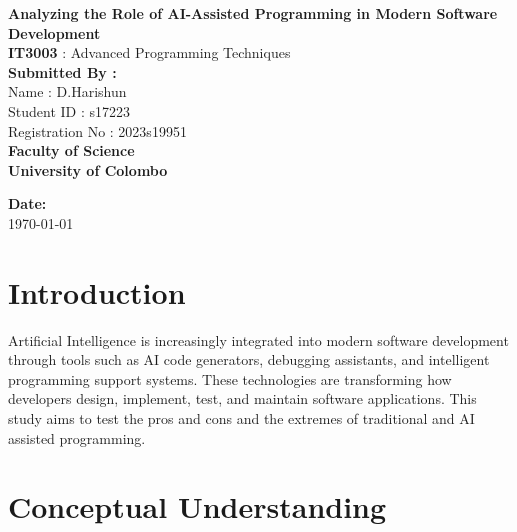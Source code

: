 \documentclass[12pt, a4paper]{article}
\begin{document}
\begin{titlepage}
    \begin{center}
        \vspace*{2cm}
        
        {\fontsize{24}{28}\bfseries Analyzing the Role of AI-Assisted Programming in Modern Software Development}\\[0.8cm]
        
        {\fontsize{14}{16} \textbf{IT3003} : Advanced Programming Techniques}\\[2cm]
        
        \textbf{Submitted By :}\\[0.2cm]
        {\fontsize{14}{16} Name : D.Harishun}\\
        {\fontsize{14}{16} Student ID : s17223}\\
        {\fontsize{14}{16} Registration No : 2023s19951}\\[3cm]

        \textbf{Faculty of Science}\\
        \textbf{University of Colombo}\\[0.2cm]
        
        \vfill
        
        \textbf{Date:}\\[0.2cm]
        {\fontsize{14}{16} \today}\\[1cm]
    \end{center}
\end{titlepage}
\newpage

\section{Introduction}
Artificial Intelligence is increasingly integrated into modern software development through tools
such as AI code generators, debugging assistants, and intelligent programming support systems.
These technologies are transforming how developers design, implement, test, and maintain
software applications. This study aims to test the pros and cons and the extremes of traditional and AI assisted programming.

\section{Conceptual Understanding}
\end{document}
